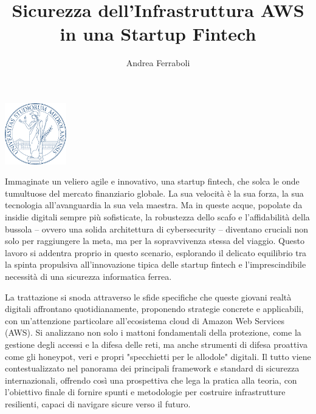\documentclass[a4paper,12pt]{report}
\begin{document}
\begin{center}
        \includegraphics[width=0.2\textwidth]{images/Unimi-logo.png}
        \vspace{1cm}
\end{center}

\title{Sicurezza dell'Infrastruttura AWS in una Startup Fintech}
\author{Andrea Ferraboli}

\beforepreface
        Immaginate un veliero agile e innovativo, una startup fintech, che solca le onde tumultuose del mercato finanziario globale. La sua velocità è la sua forza, la sua tecnologia all'avanguardia la sua vela maestra. Ma in queste acque, popolate da insidie digitali sempre più sofisticate, la robustezza dello scafo e l'affidabilità della bussola – ovvero una solida architettura di cybersecurity – diventano cruciali non solo per raggiungere la meta, ma per la sopravvivenza stessa del viaggio. Questo lavoro si addentra proprio in questo scenario, esplorando il delicato equilibrio tra la spinta propulsiva all'innovazione tipica delle startup fintech e l'imprescindibile necessità di una sicurezza informatica ferrea.

        La trattazione si snoda attraverso le sfide specifiche che queste giovani realtà digitali affrontano quotidianamente, proponendo strategie concrete e applicabili, con un'attenzione particolare all'ecosistema cloud di Amazon Web Services (AWS). Si analizzano non solo i mattoni fondamentali della protezione, come la gestione degli accessi e la difesa delle reti, ma anche strumenti di difesa proattiva come gli honeypot, veri e propri "specchietti per le allodole" digitali. Il tutto viene contestualizzato nel panorama dei principali framework e standard di sicurezza internazionali, offrendo così una prospettiva che lega la pratica alla teoria, con l'obiettivo finale di fornire spunti e metodologie per costruire infrastrutture resilienti, capaci di navigare sicure verso il futuro.
\end{document}
